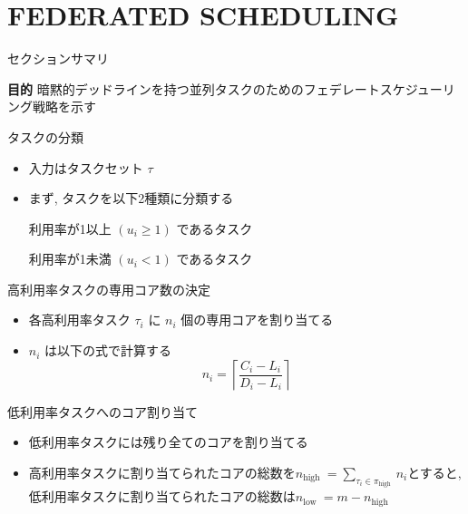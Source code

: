 
\section{FEDERATED SCHEDULING}
\label{sec: federated scheduling}

\begin{frame}{セクションサマリ}
    \begin{itembox}[l]{\textbf{目的}}
        暗黙的デッドラインを持つ並列タスクのためのフェデレートスケジューリング戦略を示す
    \end{itembox}
\end{frame}

\begin{frame}{タスクの分類}
    \begin{itemize}
        \item 入力はタスクセット $\tau$
        \item まず, タスクを以下2種類に分類する
              \begin{definition}
                  利用率が1以上 $\left(u_{i} \geq 1\right)$ であるタスク
              \end{definition}
              \begin{definition}
                  利用率が1未満 $\left(u_{i} < 1\right)$ であるタスク
              \end{definition}
    \end{itemize}
\end{frame}

\begin{frame}{高利用率タスクの専用コア数の決定}
    \begin{itemize}
        \item 各高利用率タスク $\tau_i$ に $n_{i}$ 個の専用コアを割り当てる
        \item $n_{i}$ は以下の式で計算する
              \begin{equation*}
                  n_{i}=\left\lceil\frac{C_{i}-L_{i}}{D_{i}-L_{i}}\right\rceil
              \end{equation*}
    \end{itemize}
\end{frame}

\begin{frame}{低利用率タスクへのコア割り当て}
    \begin{itemize}
        \item 低利用率タスクには残り全てのコアを割り当てる
        \item 高利用率タスクに割り当てられたコアの総数を$n_{\text {high }}=\sum_{\tau_{i} \in \pi_{\text {high }}} n_{i}$とすると, 低利用率タスクに割り当てられたコアの総数は$n_{\text {low }}=m-n_{\text {high }}$
    \end{itemize}
\end{frame}

